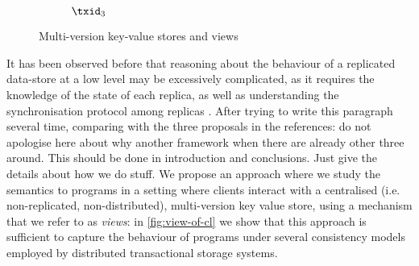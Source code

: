 \begin{figure}[t]
\begin{center}
\begin{subfigure}{0.32\textwidth}
\caption{\( \txid_3 \)}
\label{fig:long-fork-t3}
\label{fig:cp-disallowed-1}
\end{subfigure}

\end{center}

\hrulefill

\caption{Multi-version key-value stores and views}
\label{fig:hheap}
\label{fig:key-value-and-view}
\end{figure}

It has been observed before that reasoning about the behaviour of a replicated data-store at a low level 
may be excessively complicated, as it requires the knowledge of the state of each 
replica, as well as understanding the synchronisation protocol among replicas \cite{framework-concur,adya,seebelieve}. 
\ac{After trying to write this paragraph several time, comparing with the three proposals in the references: 
do not apologise here about why another framework when there are already other three around. This should 
be done in introduction and conclusions. Just give the details about how we do stuff.} 
We propose an approach where we study the semantics to programs in a setting where 
clients interact with a centralised (i.e. non-replicated, non-distributed), multi-version key value store, 
using a mechanism that we refer to as \emph{views}: in \cref{fig:view-of-cl} we show that this approach 
is sufficient to capture the behaviour of programs under several consistency models 
employed by distributed transactional storage systems.

